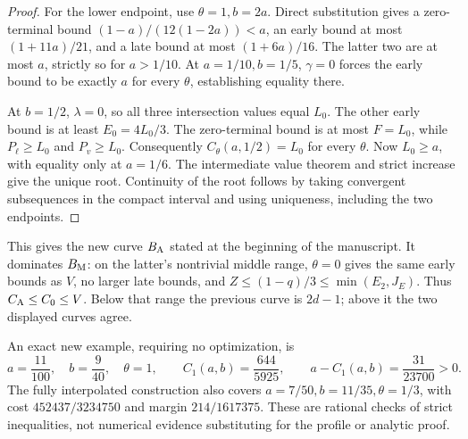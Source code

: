 \begin{proof}
For the lower endpoint, use \(\theta=1,b=2a\). Direct substitution
gives a zero-terminal bound
\((1-a)/(12(1-2a))<a\), an early bound at most
\((1+11a)/21\), and a late bound at most \((1+6a)/16\).
The latter two are at most \(a\), strictly so for \(a>1/10\).
At \(a=1/10,b=1/5\), \(\gamma=0\) forces the early bound to be
exactly \(a\) for every \(\theta\), establishing equality there.

At \(b=1/2\), \(\lambda=0\), so all three intersection values equal
\(L_0\). The other early bound is at least \(E_0=4L_0/3\).
The zero-terminal bound is at most \(F=L_0\), while
\(P_\ell\ge L_0\) and \(P_v\ge L_0\).
Consequently \(C_\theta(a,1/2)=L_0\) for every \(\theta\).
Now \(L_0\ge a\), with equality only at \(a=1/6\).
The intermediate value theorem and strict increase give the unique root.
Continuity of the root follows by taking convergent subsequences in the
compact interval and using uniqueness, including the two endpoints.
\end{proof}

This gives the new curve \(B_{\rm A}\) stated at the beginning of the
manuscript. It dominates \(B_{\rm M}\): on the latter's nontrivial middle
range, \(\theta=0\) gives the same early bounds as \(V\), no larger
late bounds, and \(Z\le(1-q)/3\le\min(E_2,J_E)\). Thus
\(C_{\rm A}\le C_0\le V\). Below that range the previous curve is
\(2d-1\); above it the two displayed curves agree.

An exact new example, requiring no optimization, is
\[
 a=\frac{11}{100},\quad b=\frac9{40},\quad\theta=1,
 \qquad C_1(a,b)=\frac{644}{5925},\qquad
 a-C_1(a,b)=\frac{31}{23700}>0.
\]
The fully interpolated construction also covers
\(a=7/50,b=11/35,\theta=1/3\), with cost
\(452437/3234750\) and margin \(214/1617375\).
These are rational checks of strict inequalities, not numerical evidence
substituting for the profile or analytic proof.
